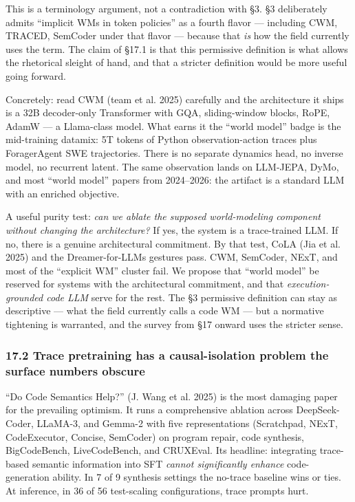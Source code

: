\documentclass{article}
\begin{document}
This is a terminology argument, not a contradiction with §3. §3
deliberately admits ``implicit WMs in token policies'' as a fourth
flavor --- including CWM, TRACED, SemCoder under that flavor --- because
that \emph{is} how the field currently uses the term. The claim of §17.1
is that this permissive definition is what allows the rhetorical sleight
of hand, and that a stricter definition would be more useful going
forward.

Concretely: read CWM (team et al. 2025) carefully and the architecture
it ships is a 32B decoder-only Transformer with GQA, sliding-window
blocks, RoPE, AdamW --- a Llama-class model. What earns it the ``world
model'' badge is the mid-training datamix: 5T tokens of Python
observation-action traces plus ForagerAgent SWE trajectories. There is
no separate dynamics head, no inverse model, no recurrent latent. The
same observation lands on LLM-JEPA, DyMo, and most ``world model''
papers from 2024--2026: the artifact is a standard LLM with an enriched
objective.

A useful purity test: \emph{can we ablate the supposed world-modeling
component without changing the architecture?} If yes, the system is a
trace-trained LLM. If no, there is a genuine architectural commitment.
By that test, CoLA (Jia et al. 2025) and the Dreamer-for-LLMs gestures
pass. CWM, SemCoder, NExT, and most of the ``explicit WM'' cluster fail.
We propose that ``world model'' be reserved for systems with the
architectural commitment, and that \emph{execution-grounded code LLM}
serve for the rest. The §3 permissive definition can stay as descriptive
--- what the field currently calls a code WM --- but a normative
tightening is warranted, and the survey from §17 onward uses the
stricter sense.

\hypertarget{trace-pretraining-has-a-causal-isolation-problem-the-surface-numbers-obscure}{%
\subsubsection{17.2 Trace pretraining has a causal-isolation problem the
surface numbers
obscure}\label{trace-pretraining-has-a-causal-isolation-problem-the-surface-numbers-obscure}}

``Do Code Semantics Help?'' (J. Wang et al. 2025) is the most damaging
paper for the prevailing optimism. It runs a comprehensive ablation
across DeepSeek-Coder, LLaMA-3, and Gemma-2 with five representations
(Scratchpad, NExT, CodeExecutor, Concise, SemCoder) on program repair,
code synthesis, BigCodeBench, LiveCodeBench, and CRUXEval. Its headline:
integrating trace-based semantic information into SFT \emph{cannot
significantly enhance} code-generation ability. In 7 of 9 synthesis
settings the no-trace baseline wins or ties. At inference, in 36 of 56
test-scaling configurations, trace prompts hurt.
\end{document}
